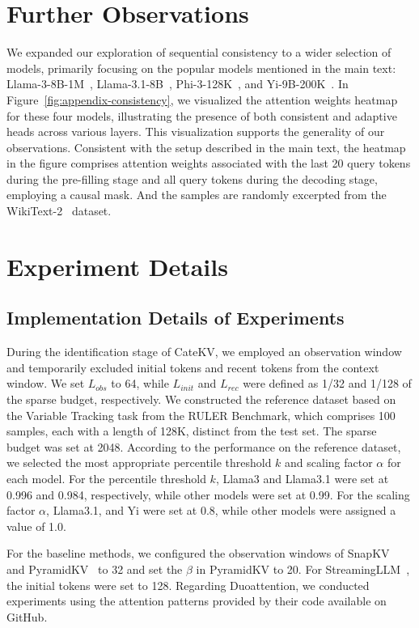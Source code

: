 \newpage
\appendix
\onecolumn
\section{Further Observations}
\label{appendix-consistency}

We expanded our exploration of sequential consistency to a wider selection of models, primarily focusing on the popular models mentioned in the main text: Llama-3-8B-1M~\cite{llama3-8b}, Llama-3.1-8B~\cite{llama3-1}, Phi-3-128K~\cite{phi}, and Yi-9B-200K~\cite{yi}. In Figure~\ref{fig:appendix-consistency}, we visualized the attention weights heatmap for these four models, illustrating the presence of both consistent and adaptive heads across various layers. This visualization supports the generality of our observations. Consistent with the setup described in the main text, the heatmap in the figure comprises attention weights associated with the last 20 query tokens during the pre-filling stage and all query tokens during the decoding stage, employing a causal mask. And the samples are randomly excerpted from the WikiText-2~\cite{wikitext} dataset.


\section{Experiment Details}
\subsection{Implementation Details of Experiments}
\label{appendix-exp-detail}
During the identification stage of CateKV, we employed an observation window and temporarily excluded initial tokens and recent tokens from the context window. We set $L_{obs}$ to 64, while $L_{init}$ and $L_{rec}$ were defined as 1/32 and 1/128 of the sparse budget, respectively. We constructed the reference dataset based on the Variable Tracking task from the RULER Benchmark, which comprises 100 samples, each with a length of 128K, distinct from the test set. The sparse budget was set at 2048. According to the performance on the reference dataset, we selected the most appropriate percentile threshold $k$ and scaling factor $\alpha$ for each model. For the percentile threshold $k$, Llama3 and Llama3.1 were set at 0.996 and 0.984, respectively, while other models were set at 0.99. For the scaling factor $\alpha$, Llama3.1, and Yi were set at 0.8, while other models were assigned a value of 1.0.

For the baseline methods, we configured the observation windows of SnapKV~\cite{snapkv} and PyramidKV~\cite{pyramidkv} to 32 and set the $\beta$ in PyramidKV to 20. For StreamingLLM~\cite{streamingllm}, the initial tokens were set to 128. Regarding Duoattention\cite{duoattention}, we conducted experiments using the attention patterns provided by their code available on GitHub.

